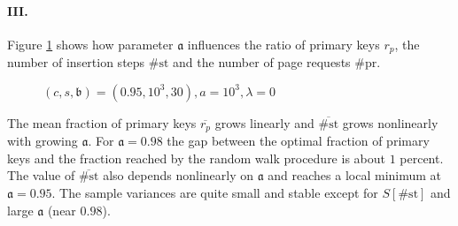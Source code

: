\let\accentvec\vec \documentclass{llncs}
\newcommand{\fr}{\lambda}
\newcommand{\npn}{r_p}
\newcommand{\Enpn}{\overline{r_p}}
\newcommand{\pr}{{\scriptstyle \#}\mathrm{pr}}
\newcommand{\st}{{\scriptstyle \#}\mathrm{st}}
\newcommand{\Est}{\overline{{\scriptstyle \#}\mathrm{st}}}
\newcommand{\palpha}{\mathfrak{a}}
\newcommand{\pbeta}{\mathfrak{b}}
\newcommand{\figPath}{.}
\begin{document}
\paragraph{III.}Figure \ref{fig:parameter_alpha} shows how parameter $\palpha$ influences the 
ratio of primary keys $\npn$, the number of insertion steps $\st$ and the number of page requests $\pr$.

\begin{figure}[htb]
\centering
\subfigure{\scalebox{0.58}{}}
 \hspace{0.2cm}
\subfigure{\scalebox{0.58}{}}
 \hspace{0.2cm}
\subfigure{\scalebox{0.58}{}}
\caption{\label{fig:parameter_alpha} $(c,s,\pbeta)=(0.95,10^3,30), a=10^3, \fr=0$}
\end{figure}

The mean fraction of primary keys $\Enpn$ grows linearly and $\Est$ grows nonlinearly with growing $\palpha$.
For $\palpha=0.98$ the gap between the optimal fraction of primary keys and the fraction reached by the random walk procedure is about $1$ percent. The value of $\Est$ also depends nonlinearly on $\palpha$ and reaches a local minimum at $\palpha=0.95$. The sample variances are quite small and stable except for $S[\st]$ and large $\palpha$ (near $0.98$).
\end{document}
